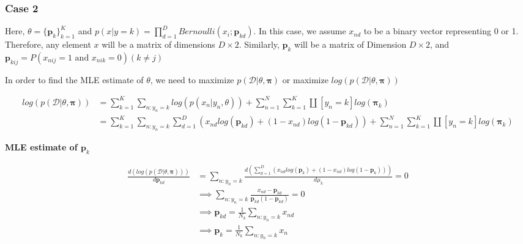 \documentclass{article}
\begin{document}
\begin{addmargin}{1.5em}
\begin{addmargin}{1.5em}
\begin{addmargin}{1.5em}
        \end{addmargin}
        
        \subsubsection*{Case 2}
        \begin{addmargin}{1.5em}
        
            Here, $\theta = \{\boldsymbol{p}_k\}_{k = 1}^{K}$ and $p(x | y = k) = \prod_{d = 1}^{D} Bernoulli(x_i; \boldsymbol{p}_{kd})$. In this case, we assume $x_{nd}$ to be a binary vector representing 0 or 1. Therefore, any element $x$ will be a matrix of dimensions $D \times 2$. Similarly, $\boldsymbol{p}_k$ will be a matrix of Dimension $D \times 2$, and $\boldsymbol{p}_{kij} = P(x_{nij} = 1 \text{ and } x_{nik} = 0) (k \ne j)$
           
            
            In order to find the MLE estimate of $\theta$, we need to maximize $p(\mathcal{D} | \theta, \boldsymbol{\pi})$ or maximize $log(p(\mathcal{D} | \theta, \boldsymbol{\pi}))$
            
            \begin{align*}
                log(p(\mathcal{D} | \theta, \boldsymbol{\pi})) &= \sum_{k = 1}^{K} \sum_{n:y_n = k} log(p(x_n | y_n, \theta)) + \sum_{n = 1}^{N} \sum_{k = 1}^{K} \amalg[y_n = k] log(\boldsymbol{\pi}_k) \\
                                                               &= \sum_{k = 1}^{K} \sum_{n:y_n = k} \sum_{d = 1}^{D} (x_{nd}log(\boldsymbol{p}_{kd}) + (1 - x_{nd})log(1 - \boldsymbol{p}_{kd})) + \sum_{n = 1}^{N} \sum_{k = 1}^{K} \amalg[y_n = k] log(\boldsymbol{\pi}_k)
            \end{align*}
            
            \textbf{MLE estimate of $\boldsymbol{p}_k$}
            
            \begin{align*}
                \frac{d(log(p(\mathcal{D} | \theta, \boldsymbol{\pi})))}{d\boldsymbol{p}_{kd}} &= \sum_{n:y_n = k} \frac{d(\sum_{d = 1}^{D} (x_{nd}log(\boldsymbol{p}_k) + (1 - x_{nd})log(1 - \boldsymbol{p}_k)))}{d\mu_k} = 0 \\
                                                                                 &\implies \sum_{n:y_n = k} \frac{x_{nd} - \boldsymbol{p}_{kd}}{\boldsymbol{p}_{kd}(1 - \boldsymbol{p}_{kd})} = 0 \\
                                                                                 &\implies \boldsymbol{p}_{kd} = \frac{1}{N_k} \sum_{n:y_n = k} x_{nd} \\
                                                                                 &\implies \boldsymbol{p}_k = \frac{1}{N_k} \sum_{n:y_n = k} x_n
            \end{align*}
            

\end{addmargin}
\end{addmargin}
\end{addmargin}
\end{document}
